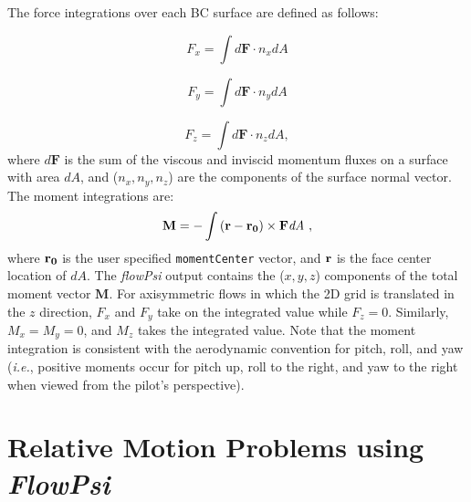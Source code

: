\documentclass{article}
\begin{document}
The force integrations over each BC surface are defined as follows:

\begin{equation}
F_x = \int{d\textbf{F} \cdot n_x dA}
\end{equation}

\begin{equation}
F_y = \int{d\textbf{F} \cdot n_y dA}
\end{equation}

\begin{equation}
F_z = \int{d\textbf{F} \cdot n_z dA},
\end{equation}
where $d\textbf{F}$ is the sum of the viscous and inviscid momentum fluxes on a surface with area $dA$, and ($n_x,n_y,n_z$) are the components of the surface normal vector.  The moment integrations are:
\begin{equation}
\textbf{M} = - \int{ \bf{(r - r_0)} \times \textbf{F} \textit{dA}} ~ ,
\end{equation}
where $\bf{r_0}$ is the user specified \verb!momentCenter! vector, and
$\bf{r}$ is the face center location of $dA$.  The {\em flowPsi}
output contains the ($x,y,z$) components of the total moment vector
$\textbf{M}$.  For axisymmetric flows in which the 2D grid is
translated in the $z$ direction, $F_x$ and $F_y$ take on the
integrated value while $F_z = 0$.  Similarly, $M_x = M_y = 0$, and
$M_z$ takes the integrated value.  Note that the moment integration is
consistent with the aerodynamic convention for pitch, roll, and yaw
({\it{i.e.}}, positive moments occur for pitch up, roll to the right,
and yaw to the right when viewed from the pilot's perspective).




\newpage
\section{Relative Motion Problems using {\em FlowPsi}}
\end{document}
